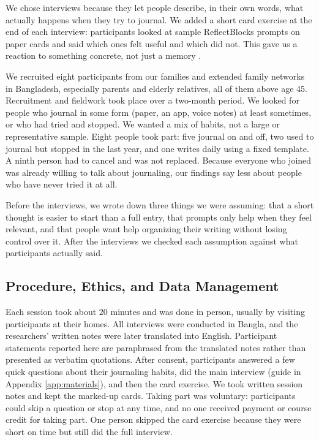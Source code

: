 \documentclass[sigconf,nonacm]{acmart}
\begin{document}
We chose interviews because they let people describe, in their own words, what
actually happens when they try to journal. We added a short card exercise at
the end of each interview: participants looked at sample ReflectBlocks
prompts on paper cards and said which ones felt useful and which did not.
This gave us a reaction to something concrete, not just a memory
\cite{preece2023interaction}.

We recruited eight participants from our families and extended family
networks in Bangladesh, especially parents and elderly relatives, all of them above age 45.
Recruitment and fieldwork took place over a two-month period. We looked for
people who journal in some form (paper, an app, voice notes) at least
sometimes, or who had tried and stopped. We wanted a mix of habits, not a large
or representative sample. Eight people took part: five
journal on and off, two used to journal but stopped in the last year, and one
writes daily using a fixed template. A ninth person had to cancel and was not
replaced. Because everyone who joined was already willing to talk about
journaling, our findings say less about people who have never tried it at all.

Before the interviews, we wrote down three things we were assuming: that a
short thought is easier to start than a full entry, that prompts only help
when they feel relevant, and that people want help organizing their writing
without losing control over it. After the interviews we checked each
assumption against what participants actually said.

\subsection{Procedure, Ethics, and Data Management}

Each session took about 20 minutes and was done in person, usually by visiting
participants at their homes. All interviews were conducted in Bangla, and the
researchers' written notes were later translated into English. Participant statements reported here are paraphrased from the
translated notes rather than presented as verbatim quotations. After consent, participants
answered a few quick questions about their journaling habits, did the main
interview (guide in Appendix
\ref{app:materials}), and then the card exercise. We took written session notes and kept the marked-up cards. Taking
part was voluntary: participants could skip a question or stop at any time,
and no one received payment or course credit for taking part. One person
skipped the card exercise because they were short on time but still did the
full interview.
\end{document}
